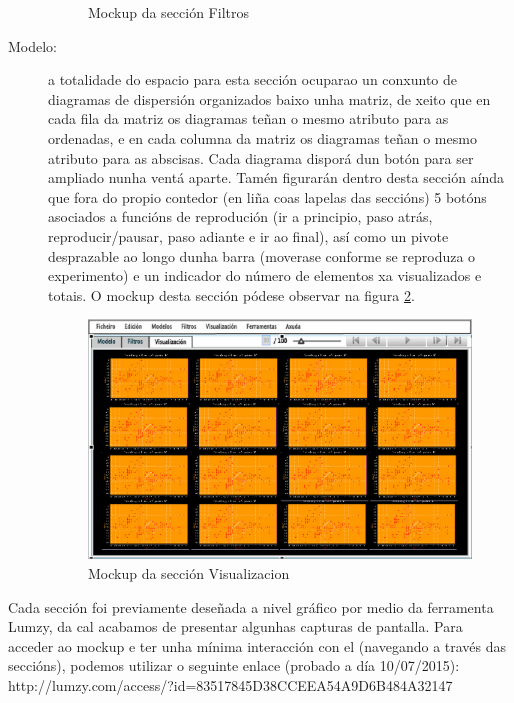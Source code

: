 \begin{description}
\begin{figure}
\caption{Mockup da sección Filtros}
\label{Filtros}
\end{figure}
\item[Modelo:] a totalidade do espacio para esta sección ocuparao un conxunto de diagramas de dispersión organizados baixo unha matriz, de xeito que en cada fila da matriz os diagramas teñan o mesmo atributo para as ordenadas, e en cada columna da matriz os diagramas teñan o mesmo atributo para as abscisas. Cada diagrama disporá dun botón para ser ampliado nunha ventá aparte. Tamén figurarán dentro desta sección aínda que fora do propio contedor (en liña coas lapelas das seccións) 5 botóns asociados a funcións de reprodución (ir a principio, paso atrás, reproducir/pausar, paso adiante e ir ao final), así como un pivote desprazable ao longo dunha barra (moverase conforme se reproduza o experimento) e un indicador do número de elementos xa visualizados e totais. O mockup desta sección pódese observar na figura \ref{Visualizacion}.
\begin{figure}
\centering
\includegraphics[width=\textwidth,height=\textheight,keepaspectratio]{figuras/Visualizacion}
\caption{Mockup da sección Visualizacion}
\label{Visualizacion}
\end{figure}
\end{description} 

Cada sección foi previamente deseñada a nivel gráfico por medio da ferramenta Lumzy, da cal acabamos de presentar algunhas capturas de pantalla. Para acceder ao mockup e ter unha mínima interacción con el (navegando a través das seccións), podemos utilizar o seguinte enlace (probado a día 10/07/2015):
\\
http://lumzy.com/access/?id=83517845D38CCEEA54A9D6B484A32147


